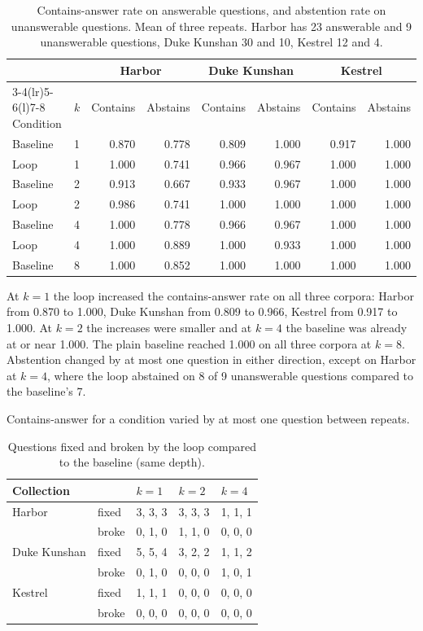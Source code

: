 \documentclass[12pt, a4paper, oneside]{report}
\begin{document}
\begin{table}[htbp]
\centering
\footnotesize
\setlength{\tabcolsep}{4pt}
\begin{tabular}{@{}llrrrrrr@{}}
\toprule
 & & \multicolumn{2}{c}{Harbor} & \multicolumn{2}{c}{Duke Kunshan} & \multicolumn{2}{c}{Kestrel} \\
\cmidrule(lr){3-4}\cmidrule(lr){5-6}\cmidrule(l){7-8}
Condition & $k$ & Contains & Abstains & Contains & Abstains & Contains & Abstains \\
\midrule
Baseline & 1 & 0.870 & 0.778 & 0.809 & 1.000 & 0.917 & 1.000 \\
Loop     & 1 & 1.000 & 0.741 & 0.966 & 0.967 & 1.000 & 1.000 \\
Baseline & 2 & 0.913 & 0.667 & 0.933 & 0.967 & 1.000 & 1.000 \\
Loop     & 2 & 0.986 & 0.741 & 1.000 & 1.000 & 1.000 & 1.000 \\
Baseline & 4 & 1.000 & 0.778 & 0.966 & 0.967 & 1.000 & 1.000 \\
Loop     & 4 & 1.000 & 0.889 & 1.000 & 0.933 & 1.000 & 1.000 \\
Baseline & 8 & 1.000 & 0.852 & 1.000 & 1.000 & 1.000 & 1.000 \\
\bottomrule
\end{tabular}
\caption{Contains-answer rate on answerable questions, and abstention rate
on unanswerable questions. Mean of three repeats. Harbor has 23 answerable
and 9 unanswerable questions, Duke Kunshan 30 and 10, Kestrel 12 and 4.}
\label{tbl:sweep}
\end{table}

At $k=1$ the loop increased the contains-answer rate on all three corpora:
Harbor from 0.870 to 1.000, Duke Kunshan from 0.809 to 0.966, Kestrel from
0.917 to 1.000. At $k=2$ the increases were smaller and at $k=4$ the
baseline was already at or near 1.000. The plain baseline reached 1.000 on
all three corpora at $k=8$. Abstention changed by at most one question in
either direction, except on Harbor at $k=4$, where the loop abstained on 8
of 9 unanswerable questions compared to the baseline's 7.

Contains-answer for a condition varied by at most one question between
repeats.

\begin{table}[htbp]
\centering
\footnotesize
\begin{tabular}{@{}lllll@{}}
\toprule
Collection & & $k=1$ & $k=2$ & $k=4$ \\
\midrule
Harbor & fixed & 3, 3, 3 & 3, 3, 3 & 1, 1, 1 \\
       & broke & 0, 1, 0 & 1, 1, 0 & 0, 0, 0 \\
Duke Kunshan & fixed & 5, 5, 4 & 3, 2, 2 & 1, 1, 2 \\
             & broke & 0, 1, 0 & 0, 0, 0 & 1, 0, 1 \\
Kestrel & fixed & 1, 1, 1 & 0, 0, 0 & 0, 0, 0 \\
        & broke & 0, 0, 0 & 0, 0, 0 & 0, 0, 0 \\
\bottomrule
\end{tabular}
\caption{Questions fixed and broken by the loop compared to the baseline
(same depth).}
\label{tbl:fixbreak}
\end{table}
\end{document}
